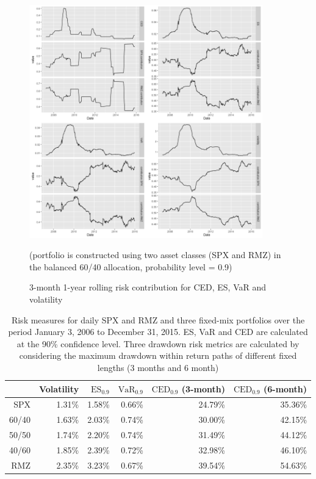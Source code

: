 \documentclass[11pt]{article}
\begin{document}
\begin{figure}[H]
\centering
\includegraphics[width = 0.9\textwidth]{../figures/risk_contribution/SPX_RMZ_64}
\caption{3-month 1-year rolling risk contribution for CED, ES, VaR and volatility}
(portfolio is constructed using two asset classes (SPX and RMZ) in the balanced 60/40 allocation, probability level = 0.9)
\label{fig:risk_contribution_SPX_RMZ_64}
\end{figure}

\begin{table}[H]
\centering
\begin{tabular}{r |r r r r r}
\hline
& Volatility & $\textrm{ES}_{0.9}$ & $\textrm{VaR}_{0.9}$ & $\textrm{CED}_{0.9}$ (3-month) & $\textrm{CED}_{0.9}$ (6-month) \\
\hline
\hline
SPX   & 1.31\% & 1.58\% & 0.66\% & 24.79\% & 35.36\%\\
60/40 & 1.63\% & 2.03\% & 0.74\% & 30.00\% & 42.15\%\\
50/50 & 1.74\% & 2.20\% & 0.74\% & 31.49\% & 44.12\%\\ 
40/60 & 1.85\% & 2.39\% & 0.72\% & 32.98\% & 46.10\%\\
RMZ   & 2.35\% & 3.23\% & 0.67\% & 39.54\% & 54.63\%\\
\hline
\end{tabular}
\caption{Risk measures for daily SPX and RMZ and three fixed-mix portfolios over the period January 3, 2006 to December 31, 2015. ES, VaR and CED are calculated at the 90\% confidence level. Three drawdown risk metrics are calculated by considering the maximum drawdown within return paths of different fixed lengths (3 months and 6 month)}
\label{table:portfolio_risk}
\end{table}
\end{document}
